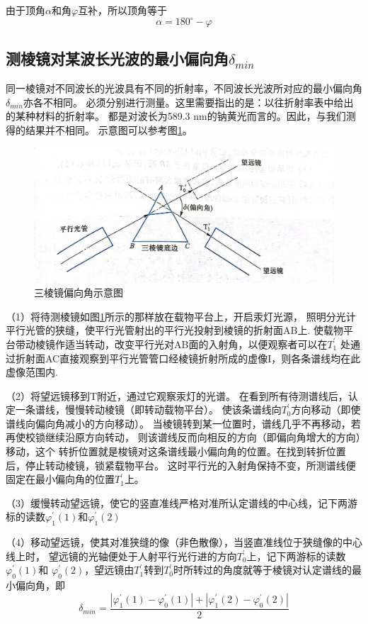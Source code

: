 \documentclass{ctexart}
\begin{document}
    由于顶角$\alpha$和角$\varphi$互补，所以顶角等于
    \begin{equation}
      \alpha=180^{\circ}-\varphi
    \end{equation}

    \subsection{测棱镜对某波长光波的最小偏向角$\delta_{min}$}
    同一棱镜对不同波长的光波具有不同的折射率，不同波长光波所对应的最小偏向角$\delta_{min}$亦各不相同。
    必须分别进行测量。这里需要指出的是：以往折射率表中给出的某种材料的折射率。
    都是对波长为589.3 nm的钠黄光而言的。因此，与我们测得的结果并不相同。
    示意图可以参考图\ref{pianxiangjiao}。
    \begin{figure}[H]
      \centering
      \includegraphics[height=0.3\textwidth,width=1\textwidth]{pianxiangjiaoshiyi.jpg}
      \caption{三棱镜偏向角示意图}\label{pianxiangjiao}
    \end{figure}
    （1）将待测棱镜如图\ref{pianxiangjiao}所示的那样放在载物平台上，开启汞灯光源，
    照明分光计平行光管的狭缝，使平行光管射出的平行光投射到棱镜的折射面AB上.
    使载物平台带动棱镜作适当转动，改变平行光对AB面的入射角，以便观察者可以在$T_{1}^{'}$
    处通过折射面AC直接观察到平行光管管口经棱镜折射所成的虚像I，则各条谱线均在此虚像范围内.

    （2）将望远镜移到T附近，通过它观察汞灯的光谱。
    在看到所有待测谱线后，认定一条谱线，慢慢转动棱镜（即转动载物平台）。
    使该条谱线向$T_{0}^{'}$方向移动（即使谱线向偏向角减小的方向移动）。
    当棱镜转到某一位置时，谱线几乎不再移动，若再使校锁继续沿原方向转动，
    则该谱线反而向相反的方向（即偏向角增大的方向）移动，这个
    转折位置就是梭镜对这条谱线最小偏向角的位置。在找到转折位置后，停止转动棱镜，锁紧载物平台。
    这时平行光的入射角保持不变，所测谱线便固定在最小偏向角的位置$T_{1}^{'}$上。

    （3）缓慢转动望远镜，使它的竖直准线严格对准所认定谱线的中心线，记下两游标的读数$\varphi_{1}^{'}(1)$和$\varphi_{1}^{'}(2)$

    （4）移动望远镜，使其对准狭缝的像（非色散像），当竖直准线位于狭缝像的中心线上时，
    望远镜的光轴便处于人射平行光行进的方向$T_{0}^{'}$上，记下两游标的读数$\varphi_{0}^{'}(1)$和
    $\varphi_{0}^{'}(2)$，望远镜由$T_{1}^{'}$转到$T_{0}^{'}$时所转过的角度就等于棱镜对认定谱线的最小偏向角，即
    \begin{equation}
      \delta_{min}=\frac{|\varphi_{1}^{'}(1)-\varphi_{0}^{'}(1)|+|\varphi_{1}^{'}(2)-\varphi_{0}^{'}(2)|}{2}
    \end{equation}
\end{document}
